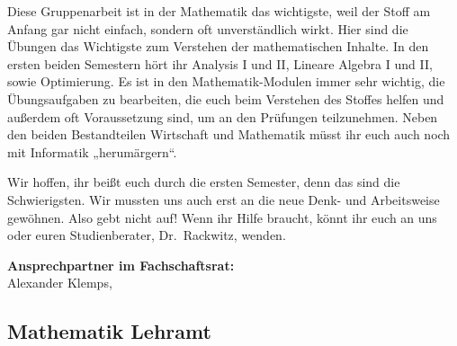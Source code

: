 Diese Gruppenarbeit ist in der Mathematik das wichtigste, weil der Stoff am Anfang gar nicht einfach, sondern oft unverständlich wirkt.
Hier sind die Übungen das Wichtigste zum Verstehen der mathematischen Inhalte.
In den ersten beiden Semestern hört ihr Analysis I und II, Lineare Algebra I und II, sowie Optimierung.
Es ist in den Mathematik-Modulen immer sehr wichtig, die Übungsaufgaben zu bearbeiten, die euch beim Verstehen des Stoffes helfen und außerdem oft Voraussetzung sind, um an den Prüfungen teilzunehmen.
Neben den beiden Bestandteilen Wirtschaft und Mathematik müsst ihr euch auch noch mit Informatik „herumärgern“.

Wir hoffen, ihr beißt euch durch die ersten Semester, denn das sind die Schwierigsten.
Wir mussten uns auch erst an die neue Denk- und Arbeitsweise gewöhnen.
Also gebt nicht auf!
Wenn ihr Hilfe braucht, könnt ihr euch an uns oder euren Studienberater, Dr.~Rackwitz, wenden.

\textbf{Ansprechpartner im Fachschaftsrat:}\\
Alexander Klemps, \\

\newpage


\subsection{Mathematik Lehramt}
\label{studiengang_lehramt}

\label{studiengang_lag}

